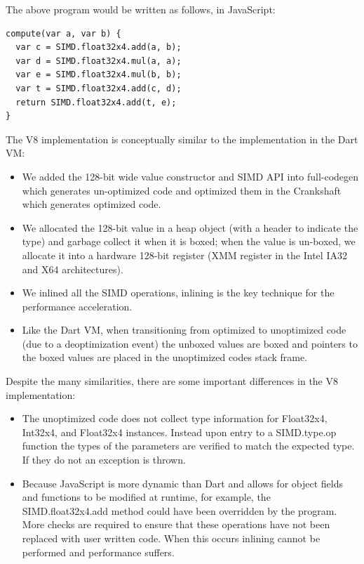 \documentclass[preprint]{sigplanconf}
\begin{document}
The above program would be written as follows, in JavaScript:

\begin{verbatim}
compute(var a, var b) {
  var c = SIMD.float32x4.add(a, b);
  var d = SIMD.float32x4.mul(a, a);
  var e = SIMD.float32x4.mul(b, b);
  var t = SIMD.float32x4.add(c, d);
  return SIMD.float32x4.add(t, e);
}
\end{verbatim}

The V8 implementation is conceptually similar to the implementation in the Dart VM:
\begin{itemize}
\item We added the 128-bit wide value constructor and SIMD API into full-codegen which generates un-optimized code and optimized them in the Crankshaft which generates optimized code. 
\item We allocated the 128-bit value in a heap object (with a header to indicate the type) and garbage collect it when it is boxed; when the value is un-boxed, we allocate it into a hardware 128-bit register (XMM register in the Intel IA32 and X64 architectures). 
\item We inlined all the SIMD operations, inlining is the key technique for the performance acceleration.
\item Like the Dart VM, when transitioning from optimized to unoptimized code (due to a deoptimization event) the unboxed values are boxed and pointers to the boxed values are placed in the unoptimized codes stack frame.
\end{itemize}

Despite the many similarities, there are some important differences in the V8 implementation:
\begin{itemize}
\item The unoptimized code does not collect type information for Float32x4, Int32x4, and Float32x4 instances. Instead upon entry to a SIMD.type.op function the types of the parameters are verified to match the expected type. If they do not an exception is thrown.
\item Because JavaScript is more dynamic than Dart and allows for object fields and functions to be modified at runtime, for example, the SIMD.float32x4.add method could have been overridden by the program. More checks are required to ensure that these operations have not been replaced with user written code. When this occurs inlining cannot be performed and performance suffers.
\end{itemize}
\end{document}
